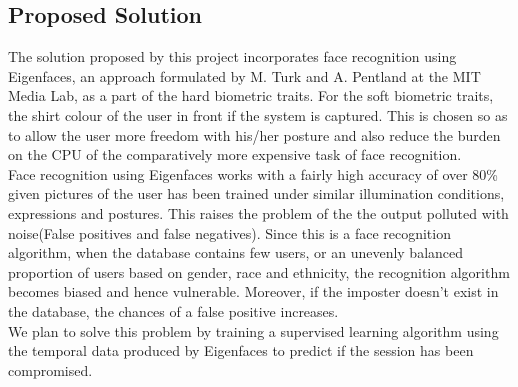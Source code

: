 \documentclass[12pt]{article}			%
\begin{document}
\subsection{Proposed Solution}
The solution proposed by this project incorporates face recognition using Eigenfaces, an approach formulated by M. Turk and A. Pentland at the MIT Media Lab, as a part of the hard biometric traits.
For the soft biometric traits, the shirt colour of the user in front if the system is captured. This is chosen so as to allow the user more freedom with his/her posture and also reduce the burden on the CPU of the comparatively more expensive task of face recognition.\\
Face recognition using Eigenfaces works with a fairly high accuracy of over 80\% given pictures of the user has been trained under similar illumination conditions, expressions and postures. 
This raises the problem of the the output polluted with noise(False positives and false negatives).
Since this is a face recognition algorithm, when the database contains few users, or an unevenly balanced proportion of users based on gender, race and ethnicity, the recognition algorithm becomes biased and hence vulnerable.
Moreover, if the imposter doesn't exist in the database, the chances of a false positive increases.\\
We plan to solve this problem by training a supervised learning algorithm using the temporal data produced by Eigenfaces to predict if the session has been compromised.
\end{document}
